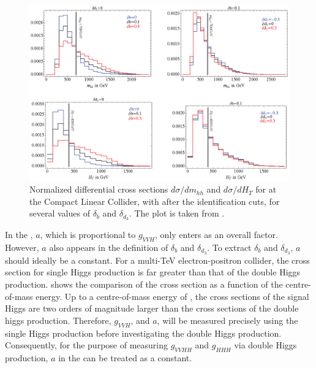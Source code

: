 \begin{figure}[htbp]
\centering
\includegraphics[width=1\textwidth]{theory/MhhHtDistribution}
\caption[]
{Normalized differential cross sections $d\sigma/dm_{hh}$ and $d\sigma/dH_{T}$ for  at the Compact Linear Collider, with  after the identification cuts, for several values of $\delta_{b}$ and $\delta_{d_3}$. The plot is taken from \cite{Contino:2013gna}.}
\label{fig:theoryMhhHtDistribution}
\end{figure}

In the , $a$, which is proportional to $g_{VVH}$, only enters as an overall factor. However, $a$ also appears in the definition of $\delta_{b}$ and $\delta_{d_3}$. To extract $\delta_{b}$ and $\delta_{d_3}$, $a$ should ideally be a constant. For a multi-TeV electron-positron collider, the cross section for single Higgs production is far greater than that of the double Higgs production.  shows the comparison of the cross section as a function of the centre-of-mass energy. Up to a centre-of-mass energy of , the cross sections of the signal Higgs are two orders of magnitude larger than the cross sections of the double higgs production. Therefore, $g_{VVH}$, and $a$, will be measured precisely using the single Higgs production before investigating the double Higgs production. Consequently, for the purpose of measuring $g_{VVHH}$ and $g_{HHH}$ via double Higgs production, $a$ in the  can be treated as a constant.

